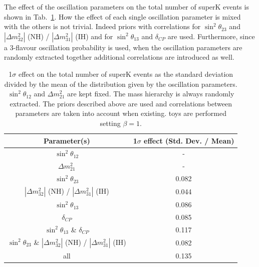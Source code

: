 \begin{enumerate}


The effect of the oscillation parameters on the total number of superK events is shown in Tab.~\ref{tab:osc_params_systeffect}.
How the effect of each single oscillation parameter is mixed with the others is not trivial.
Indeed priors with correlations for $\sin^{2}\theta_{23}$ and $|\Delta m^{2}_{32}|$ (NH) / $|\Delta m^{2}_{31}|$ (IH)
and for $\sin^{2}\theta_{13}$ and $\delta_{CP}$  are used.
Furthermore, since a 3-flavour oscillation probability is used, when the oscillation parameters are 
randomly extracted together additional correlations are introduced as well.

\begin{table}
\centering
 \begin{tabular}{| c | c |}
 \hline
 Parameter(s)                                               								&     1$\sigma$ effect (Std. Dev. / Mean)                    \\
\hline
$\sin^{2}\theta_{12}$  												&      -              	    	\\
$\Delta m^{2}_{21}$      												&      -                        	\\
$\sin^{2}\theta_{23}$                                       								&      0.082            	\\
$|\Delta m^{2}_{32}|$ (NH) / $|\Delta m^{2}_{31}|$ (IH)     						 &      0.044              	\\
$\sin^{2}\theta_{13}$  												&      0.086         	\\
$\delta_{CP}$                                               								&      0.085              	\\
\hline
$\sin^{2}\theta_{13}$  \& $\delta_{CP}$                              						 &      0.117              	\\
$\sin^{2}\theta_{23}$  \& $|\Delta m^{2}_{32}|$ (NH) / $|\Delta m^{2}_{31}|$ (IH)    	&     0.082             	\\
\hline
all																&     0.135 		\\
\hline
\end{tabular}
\caption{
1$\sigma$ effect on the total number of superK events as the standard deviation divided by the mean of the distribution
given by the oscillation parameters.
$\sin^{2}\theta_{12}$ and $\Delta m^{2}_{21}$ are kept fixed.
The mass hierarchy is always randomly extracted. The priors described above are used and
correlations between parameters are taken into account when existing.
\NumToys toys are performed setting $\beta=1$.
}
\label{tab:osc_params_systeffect}
\end{table}




\end{enumerate}

